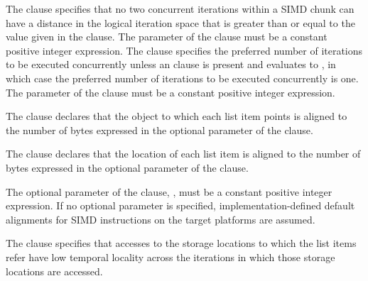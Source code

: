 The  clause specifies that no two concurrent iterations 
within a SIMD chunk can have a distance in the logical iteration space 
that is greater than or equal to the value given in the clause. The 
parameter of the  clause must be a constant positive 
integer expression. The  clause specifies the preferred 
number of iterations to be executed concurrently unless an  
clause is present and evaluates to , in which case the 
preferred number of iterations to be executed concurrently is one.
The parameter of the  clause must be a constant positive 
integer expression.

\begin{ccppspecific}
The  clause declares that the object to which each list 
item points is aligned to the number of bytes expressed in the optional 
parameter of the  clause.
\end{ccppspecific}

\begin{fortranspecific}

The  clause declares that the location of each list item
is aligned to the number of bytes expressed in the optional parameter
of the  clause.

\end{fortranspecific}

The optional parameter of the  clause, , 
must be a constant positive integer expression. If no optional parameter 
is specified, implementation-defined default alignments for SIMD 
instructions on the target platforms are assumed.

The  clause specifies that accesses to the storage 
locations to which the list items refer have low temporal locality 
across the iterations in which those storage locations are accessed.

